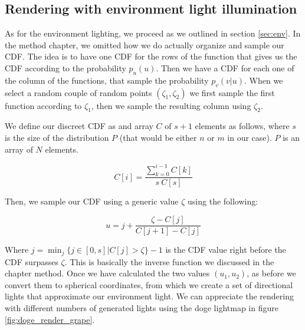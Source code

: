 \subsection{Rendering with environment light illumination}
\label{sec:envenv}
As for the environment lighting, we proceed as we outlined in section \ref{sec:env}. In the method chapter, we omitted how we do actually organize and sample our CDF. The idea is to have one CDF for the rows of the function that gives us the CDF according to the probability $p_u(u)$. Then we have a CDF for each one of the column of the functions, that sample the probability $p_v(v|u)$. When we select a random couple of random points $(\zeta_1,\zeta_2)$ we first sample the first function according to $\zeta_1$, then we sample the resulting column using $\zeta_2$.

We define our discreet CDF as and array $C$ of $s+1$ elements as follows, where $s$ is the size of the distribution $P$ (that would be either $n$ or $m$ in our case). $P$ is an array of $N$ elements.

$$
C[i] = \frac{\sum_{k = 0}^{i-1} C[k]}{s\ C[s]}
$$

Then, we sample our CDF using a generic value $\zeta$ using the following:

$$
u = j + \frac{\zeta - C[j]}{C[j + 1] - C[j]}
$$

Where $j = \min_j\{j \in [0,s] | C[j] > \zeta \} - 1$ is the CDF value right before the CDF surpasses $\zeta$. This is basically the inverse function we discussed in the chapter method. Once we have calculated the two values $(u_1,u_2)$, as before we convert them to spherical coordinates, from which we create a set of directional lights that approximate our environment light. We can appreciate the rendering with different numbers of generated lights using the doge lightmap in figure \ref{fig:doge_render_grape}.

